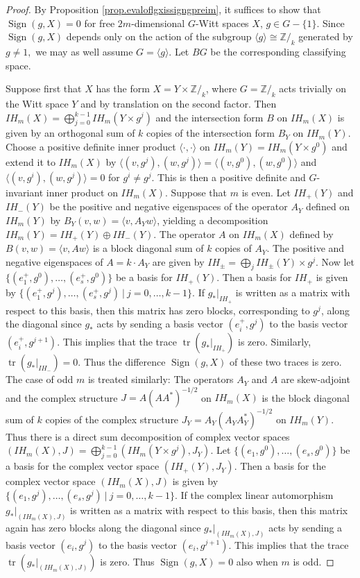 \documentclass[10pt,a4paper]{amsart}
\newcommand {\Sign}    {{\ensuremath{\operatorname{Sign}}}}
\newcommand {\intg}  {\ensuremath{\mathbb{Z}}}
\newcommand {\tr}    {{\ensuremath{\operatorname{tr}}}}
\begin{document}
\begin{proof}
By Proposition \ref{prop.evaloflgxissigngpreim}, it suffices to show
that $\Sign (g,X)=0$ for free $2m$-dimensional
$G$-Witt spaces $X$, $g\in G - \{ 1 \}$.
Since $\Sign (g,X)$ depends only on the action of the subgroup 
$\langle g \rangle \cong \intg/_k$ generated by $g\not= 1,$
we may as well assume $G = \langle g \rangle$.
Let $BG$ be the corresponding classifying space.

Suppose first that $X$ has the form $X= Y \times \intg/_k$,
where $G=\intg/_k$ acts trivially on the Witt space $Y$ and by
translation on the second factor.
Then $IH_m (X) = \bigoplus_{j=0}^{k-1} IH_m (Y \times g^j)$
and the intersection form $B$ on $IH_m (X)$ is given by an orthogonal sum
of $k$ copies of the intersection form $B_Y$ on $IH_m (Y)$.
Choose a positive definite inner product $\langle \cdot, \cdot \rangle$
on $IH_m (Y) = IH_m (Y\times g^0)$ and extend it to $IH_m (X)$
by 
$\langle (v, g^j), (w, g^j) \rangle = \langle (v,g^0), (w,g^0)  \rangle$
and $\langle (v, g^i), (w, g^j) \rangle = 0$ for $g^i \not= g^j.$
This is then a positive definite and $G$-invariant inner product
on $IH_m (X)$. Suppose that $m$ is even.
Let $IH_+ (Y)$ and $IH_- (Y)$ be the positive and negative eigenspaces
of the operator $A_Y$ defined on $IH_m (Y)$ by 
$B_Y (v,w) = \langle v, A_Y w \rangle$, yielding a decomposition
$IH_m (Y) = IH_+ (Y) \oplus IH_- (Y)$.
The operator $A$ on $IH_m (X)$
defined by $B (v,w) = \langle v, A w \rangle$
is a block diagonal sum of $k$ copies of $A_Y$. 
The positive and negative eigenspaces of $A = k\cdot A_Y$
are given by
$IH_\pm = \bigoplus_j IH_\pm (Y) \times g^j$.
Now let $\{ (e^+_1, g^0),\ldots,  (e^+_s, g^0) \}$ be a basis for $IH_+ (Y)$.
Then a basis for $IH_+$ is given by
$\{ (e^+_1, g^j),\ldots,  (e^+_s, g^j) ~|~ j=0,\ldots, k-1  \}.$
If $g_*|_{IH_+}$ is written as a matrix with respect to this basis,
then this matrix has zero blocks, corresponding to $g^j$, along the
diagonal since $g_*$ acts by sending a basis vector $(e^+_i, g^j)$ to 
the basis vector $(e^+_i, g^{j+1})$.
This implies that the trace $\tr (g_*|_{IH_+})$ is zero.
Similarly,  $\tr (g_*|_{IH_-})=0$. Thus the difference $\Sign (g,X)$
of these two traces is zero.
The case of odd $m$ is treated similarly:
The operators $A_Y$ and $A$ are skew-adjoint and
the complex structure $J = A (AA^*)^{-1/2}$ on $IH_m (X)$
is the block diagonal sum of $k$ copies of the complex structure
$J_Y = A_Y (A_Y A_Y^*)^{-1/2}$ on $IH_m (Y)$.
Thus there is a direct sum decomposition of complex vector spaces
$(IH_m (X), J) = \bigoplus_{j=0}^{k-1} (IH_m (Y \times g^j), J_Y).$
Let $\{ (e_1, g^0),\ldots,  (e_s, g^0) \}$ be a basis for the complex
vector space $(IH_+ (Y), J_Y)$.
Then a basis for the complex vector space $(IH_m (X), J)$ is given by
$\{ (e_1, g^j),\ldots,  (e_s, g^j) ~|~ j=0,\ldots, k-1  \}.$
If the complex linear automorphism
$g_*|_{(IH_m (X), J)}$ is written as a matrix with respect to this basis,
then this matrix again has zero blocks along the
diagonal since $g_*|_{(IH_m (X), J)}$ acts by sending a basis vector $(e_i, g^j)$ to 
the basis vector $(e_i, g^{j+1})$.
This implies that the trace $\tr (g_*|_{(IH_m (X), J)})$ is zero.
Thus $\Sign (g,X)=0$ also when $m$ is odd.


\end{proof}
\end{document}

